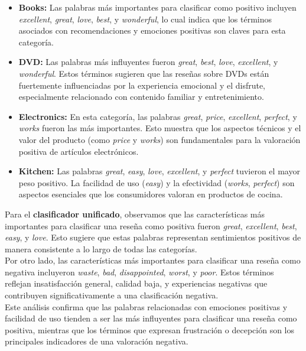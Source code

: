 \documentclass[11pt,english]{article}
\theoremstyle{plain}
\begin{document}
\begin{itemize}
    \item \textbf{Books:} Las palabras más importantes para clasificar como positivo incluyen \textit{excellent}, \textit{great}, \textit{love}, \textit{best}, y \textit{wonderful}, lo cual indica que los términos asociados con recomendaciones y emociones positivas son claves para esta categoría.
    \item \textbf{DVD:} Las palabras más influyentes fueron \textit{great}, \textit{best}, \textit{love}, \textit{excellent}, y \textit{wonderful}. Estos términos sugieren que las reseñas sobre DVDs están fuertemente influenciadas por la experiencia emocional y el disfrute, especialmente relacionado con contenido familiar y entretenimiento.
    \item \textbf{Electronics:} En esta categoría, las palabras \textit{great}, \textit{price}, \textit{excellent}, \textit{perfect}, y \textit{works} fueron las más importantes. Esto muestra que los aspectos técnicos y el valor del producto (como \textit{price} y \textit{works}) son fundamentales para la valoración positiva de artículos electrónicos.
    \item \textbf{Kitchen:} Las palabras \textit{great}, \textit{easy}, \textit{love}, \textit{excellent}, y \textit{perfect} tuvieron el mayor peso positivo. La facilidad de uso (\textit{easy}) y la efectividad (\textit{works}, \textit{perfect}) son aspectos esenciales que los consumidores valoran en productos de cocina.
\end{itemize}

\noindent Para el \textbf{clasificador unificado}, observamos que las características más importantes para clasificar una reseña como positiva fueron \textit{great}, \textit{excellent}, \textit{best}, \textit{easy}, y \textit{love}. Esto sugiere que estas palabras representan sentimientos positivos de manera consistente a lo largo de todas las categorías.\\

\noindent Por otro lado, las características más importantes para clasificar una reseña como negativa incluyeron \textit{waste}, \textit{bad}, \textit{disappointed}, \textit{worst}, y \textit{poor}. Estos términos reflejan insatisfacción general, calidad baja, y experiencias negativas que contribuyen significativamente a una clasificación negativa.\\

\noindent Este análisis confirma que las palabras relacionadas con emociones positivas y facilidad de uso tienden a ser las más influyentes para clasificar una reseña como positiva, mientras que los términos que expresan frustración o decepción son los principales indicadores de una valoración negativa.
\end{document}
